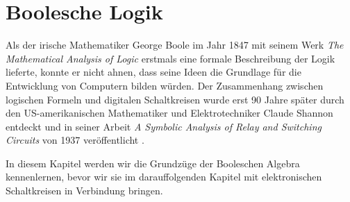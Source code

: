 \chapter{Boolesche Logik}\label{ch:BoolscheLogik}
Als der irische Mathematiker George Boole im Jahr 1847 mit seinem Werk \emph{The Mathematical Analysis of Logic} \cite{boole} erstmals eine formale Beschreibung der Logik lieferte, konnte er nicht ahnen, dass seine Ideen die Grundlage für die Entwicklung von Computern bilden würden. Der Zusammenhang zwischen logischen Formeln und digitalen Schaltkreisen wurde erst 90 Jahre später durch den US-amerikanischen Mathematiker und Elektrotechniker Claude Shannon entdeckt und in seiner Arbeit \emph{A Symbolic Analysis of Relay and Switching Circuits} von 1937 veröffentlicht \cite{shannon}. 

In diesem Kapitel werden wir die Grundzüge der Booleschen Algebra kennenlernen, bevor wir sie im darauffolgenden Kapitel mit elektronischen Schaltkreisen in Verbindung bringen.

